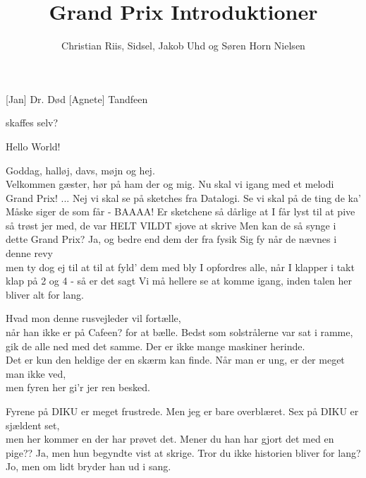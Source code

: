 \documentclass[a4paper,11pt]{article}
\title{Grand Prix Introduktioner}
\author{Christian Riis, Sidsel, Jakob Uhd og Søren Horn Nielsen}
\begin{document}
\maketitle
\begin{sketch}
\begin{roles}
  [Jan] Dr. Død 
  [Agnete] Tandfeen 
\end{roles}

\begin{props}
   skaffes selv?
\end{props}

 Hello World!

 Goddag, halløj, davs, møjn og hej. \\
Velkommen gæster, hør på ham der og mig.
 Nu skal vi igang med et melodi Grand Prix!
 ... Nej vi skal se på sketches fra Datalogi. 
 Se vi skal på de ting de ka' 
 Måske siger de som får - BAAAA! 
 Er sketchene så dårlige at I får lyst til at pive
 så trøst jer med, de var HELT VILDT sjove at skrive
 Men kan de så synge i dette Grand Prix? 
 Ja, og bedre end dem der fra fysik
 Sig fy når de nævnes i denne revy \\
men ty dog ej til at til at fyld' dem med bly
 I opfordres alle, når I klapper i takt \\
klap på 2 og 4 - så er det sagt
 Vi må hellere se at komme igang,
        inden talen her bliver alt for lang.

 Hvad mon denne rusvejleder vil fortælle, \\
når han ikke er på Cafeen? for at bælle.
 Bedst som solstrålerne var sat i ramme, \\
gik de alle ned med det samme.
 Der er ikke mange maskiner herinde. \\
Det er kun den heldige der en skærm kan finde.
 Når man er ung, er der meget man ikke ved, \\
men fyren her gi'r jer ren besked.


Fyrene på DIKU er meget frustrede.
 Men jeg er bare overblæret.
 Sex på DIKU er sjældent set, \\
men her kommer en der har prøvet det.
 Mener du han har gjort det med en pige??
 Ja, men hun begyndte vist at skrige.
 Tror du ikke historien bliver for lang?
 Jo, men om lidt bryder han ud i sang.



\end{sketch}
\end{document}
